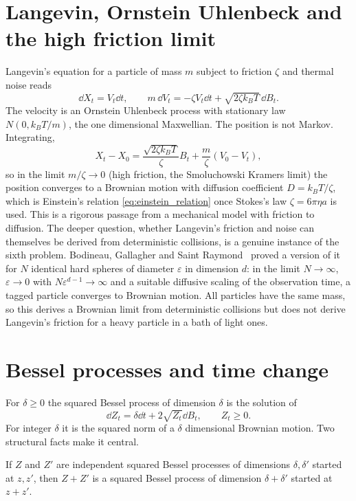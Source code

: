 \section{Langevin, Ornstein Uhlenbeck and the high friction limit}

Langevin's equation for a particle of mass $m$ subject to friction $\zeta$ and thermal noise reads
\[
\dd X_t = V_t\dd t,\qquad m\,\dd V_t = -\zeta V_t\dd t + \sqrt{2\zeta k_BT}\,\dd B_t.
\]
The velocity is an Ornstein Uhlenbeck process with stationary law $N(0,k_BT/m)$, the one dimensional Maxwellian. The position is not Markov. Integrating,
\[
X_t - X_0 = \frac{\sqrt{2\zeta k_B T}}{\zeta}B_t + \frac{m}{\zeta}(V_0 - V_t),
\]
so in the limit $m/\zeta\to0$ (high friction, the Smoluchowski Kramers limit) the position converges to a Brownian motion with diffusion coefficient $D = k_BT/\zeta$, which is Einstein's relation \eqref{eq:einstein_relation} once Stokes's law $\zeta = 6\pi\eta a$ is used. This is a rigorous passage from a mechanical model with friction to diffusion. The deeper question, whether Langevin's friction and noise can themselves be derived from deterministic collisions, is a genuine instance of the sixth problem. Bodineau, Gallagher and Saint Raymond~\cite{bgs2016} proved a version of it for $N$ identical hard spheres of diameter $\varepsilon$ in dimension $d$: in the limit $N\to\infty$, $\varepsilon\to0$ with $N\varepsilon^{d-1}\to\infty$ and a suitable diffusive scaling of the observation time, a tagged particle converges to Brownian motion. All particles have the same mass, so this derives a Brownian limit from deterministic collisions but does not derive Langevin's friction for a heavy particle in a bath of light ones.

\section{Bessel processes and time change}

For $\delta\geq0$ the squared Bessel process of dimension $\delta$ is the solution of
\[
\dd Z_t = \delta\dd t + 2\sqrt{Z_t}\dd B_t,\qquad Z_t\geq0.
\]
For integer $\delta$ it is the squared norm of a $\delta$ dimensional Brownian motion. Two structural facts make it central.

\begin{theorem}
If $Z$ and $Z'$ are independent squared Bessel processes of dimensions $\delta,\delta'$ started at $z,z'$, then $Z+Z'$ is a squared Bessel process of dimension $\delta+\delta'$ started at $z+z'$.
\end{theorem}

